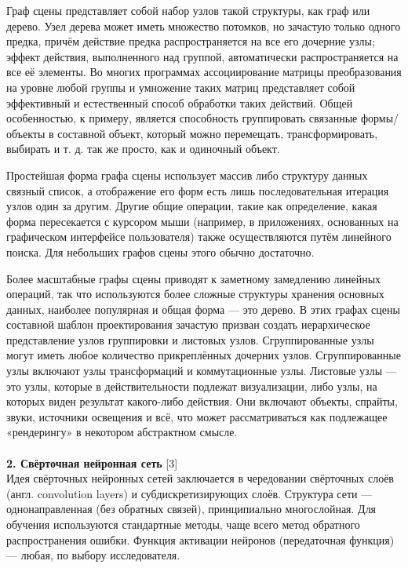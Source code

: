\documentclass{article}
\begin{document}
    Граф сцены представляет собой набор узлов такой структуры, как граф или дерево. Узел дерева может иметь множество потомков, но зачастую только одного предка, причём действие предка распространяется на все его дочерние узлы; эффект действия, выполненного над группой, автоматически распространяется на все её элементы. Во многих программах ассоциирование матрицы преобразования на уровне любой группы и умножение таких матриц представляет собой эффективный и естественный способ обработки таких действий. Общей особенностью, к примеру, является способность группировать связанные формы/объекты в составной объект, который можно перемещать, трансформировать, выбирать и т. д. так же просто, как и одиночный объект. 
    
Простейшая форма графа сцены использует массив либо структуру данных связный список, а отображение его форм есть лишь последовательная итерация узлов один за другим. Другие общие операции, такие как определение, какая форма пересекается с курсором мыши (например, в приложениях, основанных на графическом интерфейсе пользователя) также осуществляются путём линейного поиска. Для небольших графов сцены этого обычно достаточно.

Более масштабные графы сцены приводят к заметному замедлению линейных операций, так что используются более сложные структуры хранения основных данных, наиболее популярная и общая форма — это дерево. В этих графах сцены составной шаблон проектирования зачастую призван создать иерархическое представление узлов группировки и листовых узлов. Сгруппированные узлы могут иметь любое количество прикреплённых дочерних узлов. Сгруппированные узлы включают узлы трансформаций и коммутационные узлы. Листовые узлы — это узлы, которые в действительности подлежат визуализации, либо узлы, на которых виден результат какого-либо действия. Они включают объекты, спрайты, звуки, источники освещения и всё, что может рассматриваться как подлежащее «рендерингу» в некотором абстрактном смысле. \\ \\
    \textbf{2. Свёрточная нейронная сеть} [3]\\ 
    Идея свёрточных нейронных сетей заключается в чередовании свёрточных слоёв (англ. convolution layers) и субдискретизирующих слоёв. Структура сети — однонаправленная (без обратных связей), принципиально многослойная. Для обучения используются стандартные методы, чаще всего метод обратного распространения ошибки. Функция активации нейронов (передаточная функция) — любая, по выбору исследователя. \\
    
\end{document}
